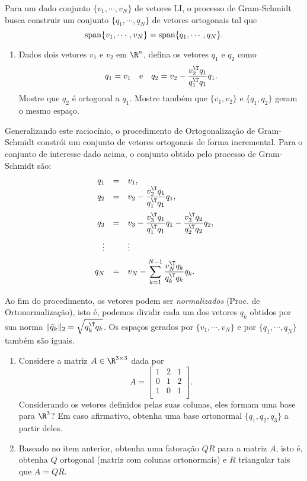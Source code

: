 \begin{problem} Para um dado conjunto $\{v_1,\cdots,v_N\}$ de vetores LI, o processo de Gram-Schmidt busca construir um conjunto $\{q_1,\cdots,q_N\}$ de vetores ortogonais tal que
    \[
    {\rm span} \{v_1,\cdots,v_N\} = {\rm span} \{q_1,\cdots,q_N\}.
    \]
\begin{enumerate}[label=(\alph*),series=gram]
  \item Dados dois vetores $v_1$ e $v_2$ em $\R^n$, defina os vetores $q_1$ e $q_2$ como
  \[
  q_1 = v_1 \quad \text{e} \quad q_2 = v_2 - \frac{v_2^\T q_1}{q_1^\T q_1}q_1.
  \]
  Mostre que $q_2$ é ortogonal a $q_1$. Mostre também que $\{v_1,v_2\}$ e $\{q_1, q_2\}$ geram o mesmo espaço.
\end{enumerate}
  Generalizando este raciocínio, o procedimento de Ortogonalização de Gram-Schmidt constrói um conjunto de vetores ortogonais de forma incremental. Para o conjunto de interesse dado acima, o conjunto obtido pelo processo de Gram-Schmidt são:
      \[
      \begin{array}{rcl}
        \displaystyle q_1 & = & \displaystyle  v_1, \\ \vspace{0.2cm}
        \displaystyle q_2 & = & \displaystyle v_2 - \frac{v_2^\T q_1}{q_1^\T q_1} q_1, \\ \vspace{0.2cm}
        \displaystyle q_3 & = & \displaystyle v_3 - \frac{v_3^\T q_1}{q_1^\T q_1}q_1 - \frac{v_3^\T q_2}{q_2^\T q_2}q_2, \\ \vspace{0.2cm}
        \vdots & & \vdots \\ \vspace{0.2cm}
        \displaystyle q_N & = &\displaystyle  v_N - \sum_{k = 1}^{N-1}\frac{v_N^\T q_k}{q_k^\T q_k}q_k.
      \end{array}
      \]
   Ao fim do procedimento, os vetores podem ser {\em normalizados} (Proc. de Ortonormalização), isto é, podemos dividir cada um dos vetores $q_k$ obtidos por sua norma $\|\bar q_k\|_2 = \sqrt{q_k^\T q_k}$. Os espaços gerados por $\{v_1, \cdots, v_N\}$ e por $\{ q_1, \cdots, q_N\}$ também são iguais.
\begin{enumerate}[resume*=gram]
  \item Considere a matriz $A \in \R^{3 \times 3}$ dada por
  \[
  A=\begin{bmatrix}1 & 2 & 1\\
                 0 & 1 & 2\\
                 1 & 0 & 1\\
   \end{bmatrix}.
  \]
  Considerando os vetores definidos pelas suas colunas, eles formam uma base para $\R^3$? Em caso afirmativo, obtenha uma base ortonormal $\{q_1, q_2, q_3\}$ a partir deles.
  \item Baseado no item anterior, obtenha uma fatoração $QR$ para a matriz $A$, isto é, obtenha $Q$ ortogonal (matriz com colunas ortonormais) e $R$ triangular tais que $A=QR$.
\end{enumerate}
\end{problem}

